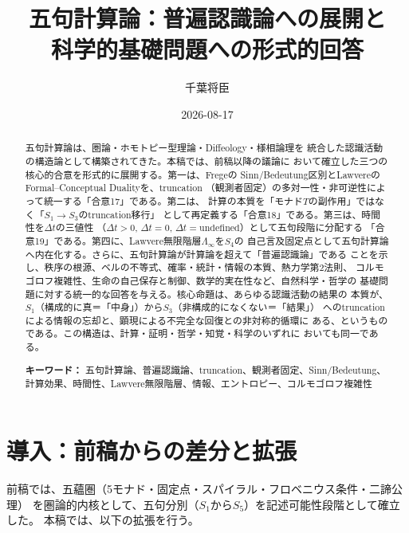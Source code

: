 \documentclass[11pt,a4paper]{ltjsarticle}
\title{五句計算論：普遍認識論への展開と\\
科学的基礎問題への形式的回答}
\author{千葉将臣}
\date{2026-08-17}
\theoremstyle{remark}
\newcommand{\dt}{\Delta t}
\newcommand{\LawvereInfinity}{\Lambda_\infty}
\begin{document}
\maketitle

\begin{abstract}
五句計算論は、圏論・ホモトピー型理論・Diffeology・様相論理を
統合した認識活動の構造論として構築されてきた。本稿では、前稿以降の議論に
おいて確立した三つの核心的合意を形式的に展開する。第一は、Fregeの
Sinn/Bedeutung区別とLawvereのFormal--Conceptual Dualityを、truncation
（観測者固定）の多対一性・非可逆性によって統一する「合意17」である。第二は、
計算の本質を「モナド$T$の副作用」ではなく「$S_1\to S_3$のtruncation移行」
として再定義する「合意18」である。第三は、時間性を$\dt$の三値性
（$\dt>0$, $\dt=0$, $\dt=\mathrm{undefined}$）として五句段階に分配する
「合意19」である。第四に、Lawvere無限階層$\LawvereInfinity$を$S_4$の
自己言及固定点として五句計算論へ内在化する。さらに、五句計算論が計算論を超えて「普遍認識論」である
ことを示し、秩序の根源、ベルの不等式、確率・統計・情報の本質、熱力学第2法則、
コルモゴロフ複雑性、生命の自己保存と制御、数学的実在性など、自然科学・哲学の
基礎問題に対する統一的な回答を与える。核心命題は、あらゆる認識活動の結果の
本質が、$S_1$（構成的に真＝「中身」）から$S_3$（非構成的になくない＝「結果」）
へのtruncationによる情報の忘却と、顕現による不完全な回復との非対称的循環に
ある、というものである。この構造は、計算・証明・哲学・知覚・科学のいずれに
おいても同一である。

\medskip
\noindent\textbf{キーワード：}
五句計算論、普遍認識論、truncation、観測者固定、Sinn/Bedeutung、
計算効果、時間性、Lawvere無限階層、情報、エントロピー、コルモゴロフ複雑性
\end{abstract}

\section{導入：前稿からの差分と拡張}

前稿では、五蘊圏（5モナド・固定点・スパイラル・フロベニウス条件・二諦公理）
を圏論的内核として、五句分別（$S_1$から$S_5$）を記述可能性段階として確立した。
本稿では、以下の拡張を行う。
\end{document}
